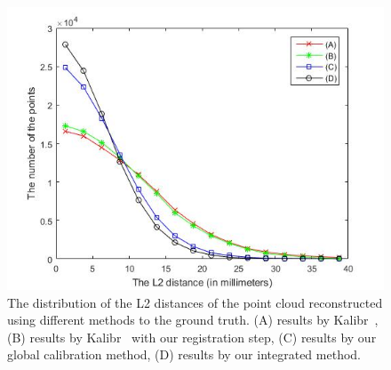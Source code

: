 \begin{figure}[ht]
	\centering
	\includegraphics[width=\columnwidth]{image/distribution.jpg}
	\caption{The distribution of the L2 distances of the point cloud reconstructed using different methods to the ground truth. (A) results by Kalibr~\cite{Maye2013Self}, (B) results by Kalibr~\cite{Maye2013Self} with our registration step, (C) results by our global calibration method, (D) results by our integrated method.}
	\label{fig:histogram}
\end{figure}

